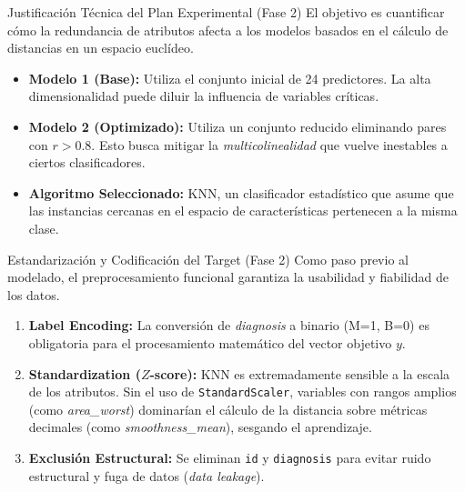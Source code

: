 \documentclass{beamer}
\begin{document}
	\begin{frame}{Justificación Técnica del Plan Experimental (Fase 2)}
		El objetivo es cuantificar cómo la redundancia de atributos afecta a los modelos basados en el cálculo de distancias en un espacio euclídeo.
		
		\begin{itemize}
			\item<2-> \textbf{Modelo 1 (Base):} Utiliza el conjunto inicial de 24 predictores. La alta dimensionalidad puede diluir la influencia de variables críticas.
			\item<3-> \textbf{Modelo 2 (Optimizado):} Utiliza un conjunto reducido eliminando pares con $r > 0.8$. Esto busca mitigar la \textit{multicolinealidad} que vuelve inestables a ciertos clasificadores.
			\item<4-> \textbf{Algoritmo Seleccionado:} KNN, un clasificador estadístico que asume que las instancias cercanas en el espacio de características pertenecen a la misma clase.
		\end{itemize}
	\end{frame}
	
	\begin{frame}{Estandarización y Codificación del Target (Fase 2)}
		Como paso previo al modelado, el preprocesamiento funcional garantiza la usabilidad y fiabilidad de los datos.
		
		\begin{enumerate}
			\item<2-> \textbf{Label Encoding:} La conversión de \textit{diagnosis} a binario (M=1, B=0) es obligatoria para el procesamiento matemático del vector objetivo $y$.
			\item<3-> \textbf{Standardization ($Z$-score):} KNN es extremadamente sensible a la escala de los atributos. Sin el uso de \texttt{StandardScaler}, variables con rangos amplios (como \textit{area\_worst}) dominarían el cálculo de la distancia sobre métricas decimales (como \textit{smoothness\_mean}), sesgando el aprendizaje.
			\item<4-> \textbf{Exclusión Estructural:} Se eliminan \texttt{id} y \texttt{diagnosis} para evitar ruido estructural y fuga de datos (\textit{data leakage}).
		\end{enumerate}
	\end{frame}
	
\end{document}
